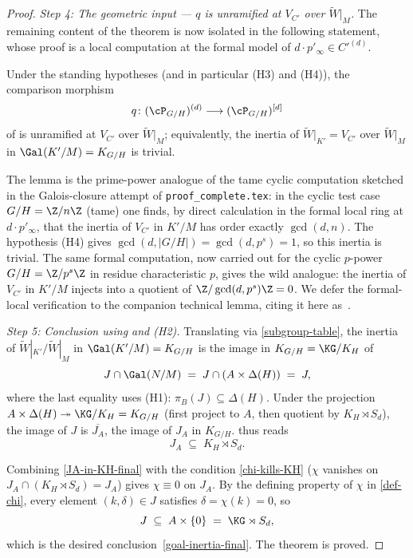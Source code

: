 \begin{proof}
\medskip
\textit{Step 4: The geometric input — $q$ is unramified at $V_{C'}$ over $\widetilde W|_M$.}\quad
The remaining content of the theorem is now isolated in the following
statement, whose proof is a local computation at the formal model of
$d \cdot p'_\infty \in C'^{(d)}$.

\begin{lemma}\label{lem:q-unramified-VCprime}
Under the standing hypotheses (and in particular (H3) and (H4)), the comparison
morphism
\[
q \colon (\cP_{G/H})^{(d)} \longrightarrow (\cP_{G/H})^{[d]}
\]
of  is unramified at $V_{C'}$ over
$\widetilde W|_M$; equivalently, the inertia of $\widetilde W|_{K'} = V_{C'}$
over $\widetilde W|_M$ in $\Gal(K'/M) = K_{G/H}$ is trivial.
\end{lemma}

\noindent
The lemma is the prime-power analogue of the tame cyclic computation sketched
in the Galois-closure attempt of \texttt{proof\_complete.tex}: in the cyclic test case
$G/H = \Z/n\Z$ (tame) one finds, by direct calculation in the formal local
ring at $d \cdot p'_\infty$, that the inertia of $V_{C'}$ in $K'/M$ has order
exactly $\gcd(d, n)$. The hypothesis (H4) gives
$\gcd(d, |G/H|) = \gcd(d, p^s) = 1$, so this inertia is trivial. The same
formal computation, now carried out for the cyclic $p$-power
$G/H = \Z/p^s\Z$ in residue characteristic $p$, gives the wild analogue: the
inertia of $V_{C'}$ in $K'/M$ injects into a quotient of
$\Z/\gcd(d, p^s)\Z = 0$. We defer the formal-local verification to the
companion technical lemma, citing it here as~.

\medskip
\textit{Step 5: Conclusion using  and (H2).}\quad
Translating  via
\eqref{subgroup-table}, the inertia of $\widetilde W|_{K'}/\widetilde W|_M$
in $\Gal(K'/M) = K_{G/H}$ is the image in $K_{G/H} = \KG/K_H$ of
\[
J \cap \Gal(N/M) \;=\; J \cap (A \times \Delta(H)) \;=\; J,
\]
where the last equality uses (H1): $\pi_B(J) \subseteq \Delta(H)$. Under the
projection $A \times \Delta(H) \twoheadrightarrow \KG/K_H = K_{G/H}$ (first
project to $A$, then quotient by $K_H \rtimes S_d$), the image of $J$ is
$\overline{J_A}$, the image of $J_A$ in $K_{G/H}$.
 thus reads
\begin{equation}\label{eq:JA-in-KH-final}
J_A \;\subseteq\; K_H \rtimes S_d.
\end{equation}

Combining \eqref{JA-in-KH-final} with the condition
\eqref{chi-kills-KH} ($\chi$ vanishes on
$J_A \cap (K_H \rtimes S_d) = J_A$) gives $\chi \equiv 0$ on $J_A$. By the
defining property of $\chi$ in \eqref{def-chi}, every element
$(k, \delta) \in J$ satisfies $\delta = \chi(k) = 0$, so
\[
J \;\subseteq\; A \times \{0\} \;=\; \KG \rtimes S_d,
\]
which is the desired conclusion~\eqref{goal-inertia-final}. The theorem is
proved.
\end{proof}

